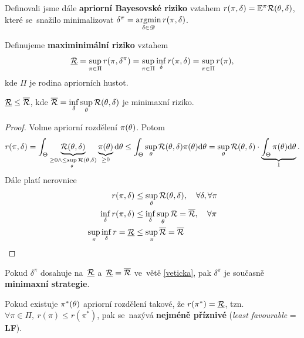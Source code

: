 Definovali jsme dále \textbf{apriorní Bayesovské riziko} vztahem $r(\pi,\delta)=\mathbb{E}^\pi\mathcal{R}(\theta,\delta)$, které se~snažilo minimalizovat $\delta^{\pi}=\mathop{\mathrm{argmin}}\limits_{\delta\in\mathscr{D}}r(\pi,\delta)$.
\begin{define}
	Definujeme \textbf{maximinimální riziko} vztahem $$\underline{\mathcal{R}}=\sup\limits_{\pi\in\Pi} r(\pi,\delta^{\pi})=\sup\limits_{\pi\in\Pi}\inf\limits_{\delta} r(\pi,\delta)=\sup\limits_{\pi\in\Pi}r(\pi),$$ kde $\Pi$ je rodina apriorních hustot.
\end{define}
\begin{theorem}\label{veticka}
	$\underline{\mathcal{R}}\leq \overline{\mathcal{R}}$, kde $\overline{\mathcal{R}}=\inf\limits_\delta\sup\limits_\theta \mathcal{R}(\theta,\delta)$ je minimaxní riziko.
	\begin{proof}
		Volme apriorní rozdělení $\pi(\theta)$. Potom $$ r(\pi,\delta)=\int_\Theta\underbrace{\mathcal{R}(\theta,\delta)}_{\geq0\wedge\leq \sup\limits_{\theta}\mathcal{R}(\theta,\delta)}\underbrace{\pi(\theta)}_{\geq0}\mathrm{d}\theta\leq \int_{\Theta}\sup\limits_\theta \mathcal{R}(\theta,\delta)\pi(\theta)\mathrm{d}\theta=\sup\limits_\theta \mathcal{R}(\theta,\delta)\cdot \underbrace{\int_{\Theta}\pi(\theta)\mathrm{d}\theta}_{1}.$$
		Dále platí nerovnice \[
		\begin{split}
		r(\pi,\delta)&\leq \sup\limits_\theta\mathcal{R}(\theta,\delta),\quad \forall\delta,\forall\pi\\
		\inf\limits_\delta r(\pi,\delta)&\leq \inf\limits_\delta\sup\limits_\theta \mathcal{R} =\overline{\mathcal{R}},\quad \forall\pi\\
		\sup\limits_\pi\inf\limits_\delta r=\underline{\mathcal{R}}&\leq \sup\limits_{\pi}\overline{\mathcal{R}}=\overline{\mathcal{R}}
		\end{split}
		\]
	\end{proof}
\end{theorem}
\begin{remark}
	Pokud $\delta^\pi$ dosahuje na~$\underline{\mathcal{R}}$ a~$\underline{\mathcal{R}}=\overline{\mathcal{R}}$ ve~větě \ref{veticka}, pak $\delta^\pi$ je současně \textbf{minimaxní strategie}.
\end{remark}
\begin{define}
	Pokud existuje $\pi^\ast(\theta)$ apriorní rozdělení takové, že $r(\pi ^\ast)=\underline{\mathcal{R}}$, tzn. $\forall\pi\in\Pi,~r(\pi)\leq r(\pi^\ast)$, pak se~nazývá \textbf{nejméně příznivé} (\textit{least favourable} = \textbf{LF}).
\end{define}

